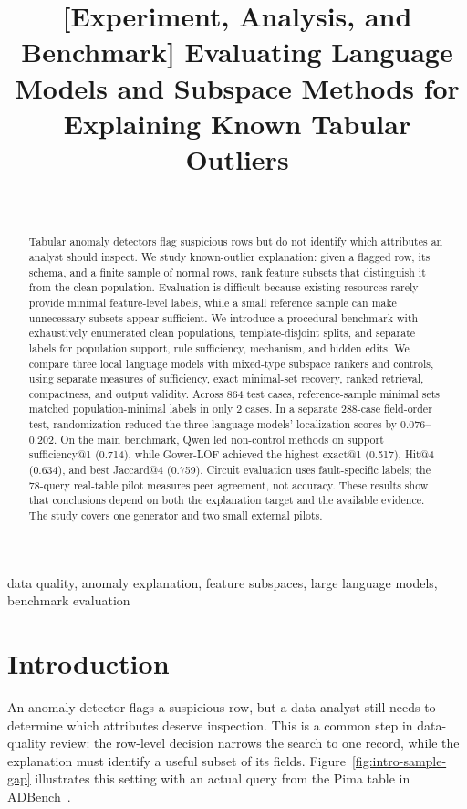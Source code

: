 \documentclass[conference]{IEEEtran}
\title{[Experiment, Analysis, and Benchmark] Evaluating Language Models and Subspace Methods for Explaining Known Tabular Outliers}
\author{\IEEEauthorblockN{Lili Guan}\\
\IEEEauthorblockA{ORCID: \url{https://orcid.org/0000-0002-4464-9384}}}
\begin{document}
\maketitle

\begin{abstract}
Tabular anomaly detectors flag suspicious rows but do not identify which attributes an analyst should inspect. We study known-outlier explanation: given a flagged row, its schema, and a finite sample of normal rows, rank feature subsets that distinguish it from the clean population. Evaluation is difficult because existing resources rarely provide minimal feature-level labels, while a small reference sample can make unnecessary subsets appear sufficient. We introduce a procedural benchmark with exhaustively enumerated clean populations, template-disjoint splits, and separate labels for population support, rule sufficiency, mechanism, and hidden edits. We compare three local language models with mixed-type subspace rankers and controls, using separate measures of sufficiency, exact minimal-set recovery, ranked retrieval, compactness, and output validity. Across 864 test cases, reference-sample minimal sets matched population-minimal labels in only 2 cases. In a separate 288-case field-order test, randomization reduced the three language models' localization scores by 0.076--0.202. On the main benchmark, Qwen led non-control methods on support sufficiency@1 (0.714), while Gower-LOF achieved the highest exact@1 (0.517), Hit@4 (0.634), and best Jaccard@4 (0.759). Circuit evaluation uses fault-specific labels; the 78-query real-table pilot measures peer agreement, not accuracy. These results show that conclusions depend on both the explanation target and the available evidence. The study covers one generator and two small external pilots.
\end{abstract}

\begin{IEEEkeywords}
data quality, anomaly explanation, feature subspaces, large language models, benchmark evaluation
\end{IEEEkeywords}

\section{Introduction}
An anomaly detector flags a suspicious row, but a data analyst still needs to determine which attributes deserve inspection. This is a common step in data-quality review: the row-level decision narrows the search to one record, while the explanation must identify a useful subset of its fields. Figure~\ref{fig:intro-sample-gap} illustrates this setting with an actual query from the Pima table in ADBench~\cite{han2022adbench}.
\end{document}
